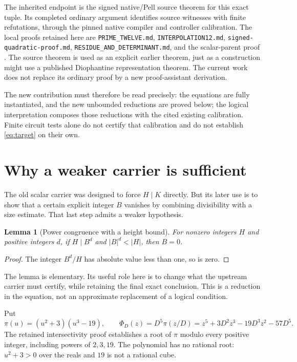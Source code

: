 \documentclass[11pt]{article}
\newcommand{\file}[1]{\nolinkurl{#1}}
\newtheorem{lemma}[theorem]{Lemma}\newtheorem{proposition}[theorem]{Proposition}
\theoremstyle{definition}\newtheorem{definition}[theorem]{Definition}
\theoremstyle{remark}\newtheorem{remark}[theorem]{Remark}
\begin{document}
The inherited endpoint is the signed native/Pell source theorem for this
exact tuple. Its completed ordinary argument identifies source witnesses
with finite refutations, through the pinned native compiler and controller
calibration. The local proofs retained here are
\file{PRIME_TWELVE.md}, \file{INTERPOLATION12.md},
\file{signed-quadratic-proof.md}, \file{RESIDUE_AND_DETERMINANT.md}, and the
scalar-parent proof \cite{scalar,prime,interpolation}. The source theorem
is used as an explicit earlier theorem, just as a construction might use
a published Diophantine representation theorem. The current work does
not replace its ordinary proof by a new proof-assistant derivation.

The new contribution must therefore be read precisely: the equations are
fully instantiated, and the new unbounded reductions are proved below;
the logical interpretation composes those reductions with the cited
existing calibration. Finite circuit tests alone do not certify that
calibration and do not establish \eqref{eq:target} on their own.

\section{Why a weaker carrier is sufficient}

The old scalar carrier was designed to force $H\mid K$ directly. But its
later use is to show that a certain explicit integer $B$ vanishes by
combining divisibility with a size estimate. That last step admits a
weaker hypothesis.

\begin{lemma}[Power congruence with a height bound]\label{lem:heightbasic}
For nonzero integers $H$ and positive integers $d$, if
$H\mid B^d$ and $|B|^d<|H|$, then $B=0$.
\end{lemma}
\begin{proof}
The integer $B^d/H$ has absolute value less than one, so is zero.
\end{proof}
The lemma is elementary. Its useful role here is to change what the
upstream carrier must certify, while retaining the final exact conclusion.
This is a reduction in the equation, not an approximate replacement of a
logical condition.

Put
\begin{equation}\label{eq:pi}
 \pi(u)=(u^2+3)(u^3-19),\qquad
 \Phi_D(z)=D^5\pi(z/D)
 =z^5+3D^2z^3-19D^3z^2-57D^5.
\end{equation}
The retained intersectivity proof establishes a root of $\pi$ modulo every
positive integer, including powers of $2,3,19$. The polynomial has no
rational root: $u^2+3>0$ over the reals and $19$ is not a rational cube.
\end{document}
